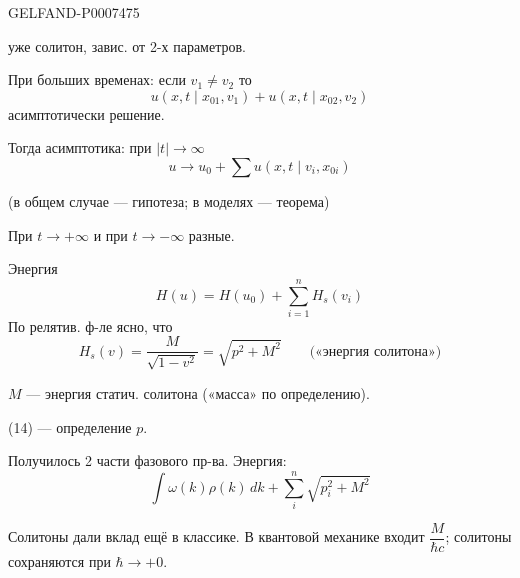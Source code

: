 \begin{GelfandAdjacentEvidence}{GELFAND-P000747}{5}


уже солитон, завис. от 2-х параметров.

При больших временах: если \(v_1\ne v_2\) то
\begin{equation*}
u(x,t\mid x_{01},v_1)+u(x,t\mid x_{02},v_2)
\tag{11}
\end{equation*}
асимптотически решение.

Тогда асимптотика: при \(|t|\to\infty\)
\begin{equation*}
u\to u_0+\sum u(x,t\mid v_i,x_{0i})
\tag{12}
\end{equation*}
\end{GelfandAdjacentEvidence}


(в общем случае --- гипотеза; в моделях --- теорема)

При \(t\to+\infty\) и при \(t\to-\infty\) разные.

Энергия
\begin{equation*}
H(u)=H(u_0)+\sum_{i=1}^{n}H_s(v_i)
\tag{13}
\end{equation*}
По релятив. ф-ле ясно, что
\begin{equation*}
H_s(v)=\frac{M}{\sqrt{1-v^2}}=\sqrt{p^2+M^2}
\qquad\text{(«энергия солитона»)}
\tag{14}
\end{equation*}

\(M\) --- энергия статич. солитона («масса» по определению).

(14) --- определение \(p\).

Получилось 2 части фазового пр-ва. Энергия:
\begin{equation*}
\int\omega(k)\rho(k)\,dk+\sum_i^n\sqrt{p_i^2+M^2}
\tag{15}
\end{equation*}

Солитоны дали вклад ещё в классике. В квантовой механике входит \(\dfrac{M}{\hbar c}\);
солитоны сохраняются при \(\hbar\to+0\).


